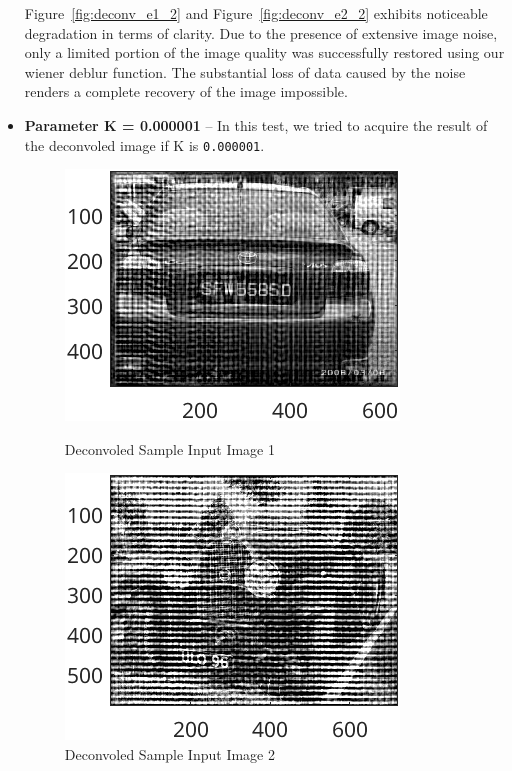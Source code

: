 \documentclass{article}
\begin{document}
\begin{itemize}
			{Figure~\ref{fig:deconv_e1_2}} and {Figure~\ref{fig:deconv_e2_2}} exhibits noticeable degradation in terms of clarity. Due to the presence of extensive image noise, only a limited portion of the image quality was successfully restored using 
			our wiener deblur function. The substantial loss of data caused by the noise renders a complete recovery of the image impossible.


		\item \textbf{Parameter K = 0.000001} – In this test, we tried to acquire the result of the deconvoled image if K is {\texttt{0.000001}}.

  		\begin{figure}[ht]
  			\centering
  			\begin{minipage}[t]{0.45\textwidth}
    			\centering
    			\includegraphics[width=\textwidth]{2AE1K0.000001}
    			\caption{Deconvoled Sample Input Image 1}
    			\label{fig:deconv_e1_3}
  			\end{minipage}\hfill
  			\begin{minipage}[t]{0.45\textwidth}
    			\centering
    			\includegraphics[width=\textwidth]{2AE2K0.000001}
    			\caption{Deconvoled Sample Input Image 2}
    			\label{fig:deconv_e2_3}
  			\end{minipage}
			\end{figure}


\end{itemize}
\end{document}
